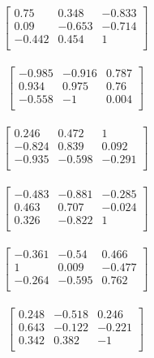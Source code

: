 \documentclass[11pt]{article}
\begin{document}
\begin{align*}
\begin{bmatrix}
0.75  & 0.348 & -0.833 \\ 
0.09  & -0.653 & -0.714\\ 
-0.442 &  0.454 &  1 \\
\end{bmatrix}
\end{align*}

\begin{align*}
\begin{bmatrix}
-0.985 & -0.916 &  0.787 \\ 
0.934 &  0.975 & 0.76\\ 
-0.558  & -1 & 0.004 \\
\end{bmatrix}
\end{align*}

\begin{align*}
\begin{bmatrix}
0.246 &  0.472  & 1 \\ 
-0.824 & 0.839 & 0.092\\ 
-0.935 & -0.598 & -0.291 \\
\end{bmatrix}
\end{align*}

\begin{align*}
\begin{bmatrix}
-0.483  & -0.881 & -0.285 \\ 
0.463 &  0.707  & -0.024\\ 
0.326 & -0.822 & 1 \\
\end{bmatrix}
\end{align*}

\begin{align*}
\begin{bmatrix}
-0.361 & -0.54 &  0.466 \\ 
1 &  0.009 & -0.477\\ 
-0.264 & -0.595  & 0.762 \\
\end{bmatrix}
\end{align*}

\begin{align*}
\begin{bmatrix}
0.248 & -0.518 & 0.246 \\ 
0.643 & -0.122 & -0.221\\ 
0.342 &  0.382  & -1 \\
\end{bmatrix}
\end{align*}
\end{document}
